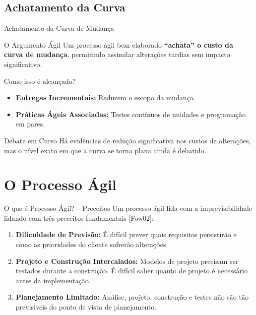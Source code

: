 \documentclass[aspectratio=169, 9pt]{beamer}
\begin{document}
\subsection{Achatamento da Curva}
\begin{frame}{Achatamento da Curva de Mudança}
  \begin{block}{O Argumento Ágil}
    Um processo ágil bem elaborado \textbf{“achata” o custo da curva de mudança}, permitindo assimilar alterações tardias sem impacto significativo.
  \end{block}

  \vspace{0.2cm}
  \begin{block}{Como isso é alcançado?}
    \begin{itemize}
      \item \textbf{Entregas Incrementais:} Reduzem o escopo da mudança.
      \item \textbf{Práticas Ágeis Associadas:} Testes contínuos de unidades e programação em pares.
    \end{itemize}
  \end{block}

  \vspace{0.2cm}
  \begin{alertblock}{Debate em Curso}
    Há evidências de redução significativa nos custos de alterações, mas o nível exato em que a curva se torna plana ainda é debatido.
  \end{alertblock}
\end{frame}

\section{O Processo Ágil}

\begin{frame}{O que é Processo Ágil? -- Preceitos}
  Um processo ágil lida com a imprevisibilidade lidando com três preceitos fundamentais [Fow02]:
  
  \vspace{0.2cm}
  \begin{enumerate}
    \item \textbf{Dificuldade de Previsão:} É difícil prever quais requisitos persistirão e como as prioridades do cliente sofrerão alterações.
    \item \textbf{Projeto e Construção Intercalados:} Modelos de projeto precisam ser testados durante a construção. É difícil saber quanto de projeto é necessário antes da implementação.
    \item \textbf{Planejamento Limitado:} Análise, projeto, construção e testes não são tão previsíveis do ponto de vista de planejamento.
  \end{enumerate}
\end{frame}
\end{document}
